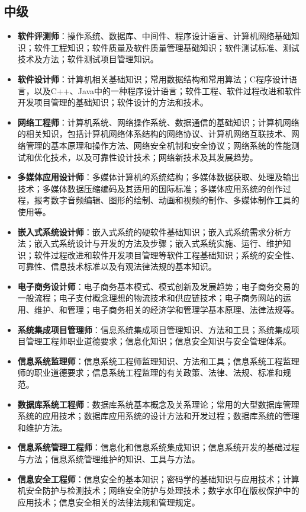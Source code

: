 \subsection{中级}
\begin{itemize}
\item \textbf{软件评测师}：操作系统、数据库、中间件、程序设计语言、计算机网络基础知识；软件工程知识；软件质量及软件质量管理基础知识；软件测试标准、测试技术及方法；软件测试项目管理知识。
\item \textbf{软件设计师}：计算机相关基础知识；常用数据结构和常用算法；C程序设计语言，以及C++、Java中的一种程序设计语言；软件工程、软件过程改进和软件开发项目管理的基础知识；软件设计的方法和技术。
\item \textbf{网络工程师}：计算机系统、网络操作系统、数据通信的基础知识；计算机网络的相关知识，包括计算机网络体系结构的网络协议、计算机网络互联技术、网络管理的基本原理和操作方法、网络安全机制和安全协议；网络系统的性能测试和优化技术，以及可靠性设计技术；网络新技术及其发展趋势。
\item \textbf{多媒体应用设计师}：多媒体计算机的系统结构；多媒体数据获取、处理及输出技术；多媒体数据压缩编码及其适用的国际标准；多媒体应用系统的创作过程，报考数字音频编辑、图形的绘制、动画和视频的制作、多媒体制作工具的使用等。
\item \textbf{嵌入式系统设计师}：嵌入式系统的硬软件基础知识；嵌入式系统需求分析方法；嵌入式系统设计与开发的方法及步骤；嵌入式系统实施、运行、维护知识；软件过程改进和软件开发项目管理等软件工程基础知识；系统的安全性、可靠性、信息技术标准以及有观法律法规的基本知识。
\item \textbf{电子商务设计师}：电子商务基本模式、模式创新及发展趋势；电子商务交易的一般流程；电子支付概念理想的物流技术和供应链技术；电子商务网站的运用、维护、和管理；电子商务相关的经济学和管理学基本原理、法律法规等。
\item \textbf{系统集成项目管理师}：信息系统集成项目管理知识、方法和工具；系统集成项目管理工程师职业道德要求；信息化知识；信息安全知识与安全管理体系。
\item \textbf{信息系统监理师}：信息系统工程师监理知识、方法和工具；信息系统工程监理师的职业道德要求；信息系统工程监理的有关政策、法律、法规、标准和规范。
\item \textbf{数据库系统工程师}：数据库系统基本概念及关系理论；常用的大型数据库管理系统的应用技术；数据库应用系统的设计方法和开发过程；数据库系统的管理和维护方法。
\item \textbf{信息系统管理工程师}：信息化和信息系统集成知识；信息系统开发的基础过程与方法；信息系统管理维护的知识、工具与方法。
\item \textbf{信息安全工程师}：信息安全的基本知识；密码学的基础知识与应用技术；计算机安全防护与检测技术；网络安全防护与处理技术；数字水印在版权保护中的应用技术；信息安全相关的法律法规和管理规定。
\end{itemize}

